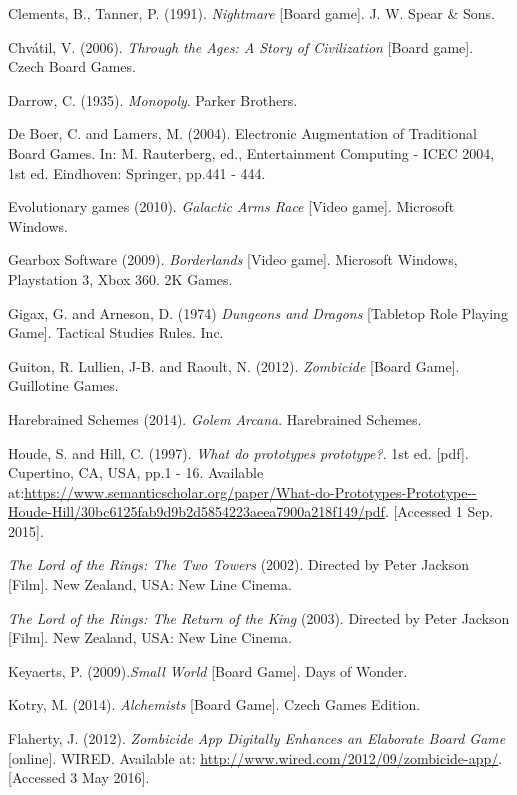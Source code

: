 \documentclass[a4paper,11pt]{report}
\begin{document}
\begin{thebibliography}{1}
Clements, B., Tanner, P. (1991). \textit{Nightmare} [Board game]. J. W. Spear \& Sons.

Chvátil, V. (2006). \textit{Through the Ages: A Story of Civilization} [Board game]. Czech Board Games.

Darrow, C. (1935). \textit{Monopoly}. Parker Brothers.

De Boer, C. and Lamers, M. (2004). Electronic Augmentation of Traditional Board Games. In: M. Rauterberg, ed., Entertainment Computing - ICEC 2004, 1st ed. Eindhoven: Springer, pp.441 - 444.

Evolutionary games (2010). \textit{Galactic Arms Race} [Video game]. Microsoft Windows. 

Gearbox Software (2009). \textit{Borderlands} [Video game]. Microsoft Windows, Playstation 3, Xbox 360. 2K Games.

Gigax, G. and Arneson, D. (1974) \textit{Dungeons and Dragons} [Tabletop Role Playing Game]. Tactical Studies Rules. Inc.

Guiton, R. Lullien, J-B. and Raoult, N. (2012). \textit{Zombicide} [Board Game]. Guillotine Games.

Harebrained Schemes (2014). \textit{Golem Arcana}. Harebrained Schemes.

Houde, S. and Hill, C. (1997). \textit{What do prototypes prototype?}. 1st ed. [pdf]. Cupertino, CA, USA, pp.1 - 16. Available at:\url{https://www.semanticscholar.org/paper/What-do-Prototypes-Prototype--Houde-Hill/30bc6125fab9d9b2d5854223aeea7900a218f149/pdf}. [Accessed 1 Sep. 2015].

\textit{The Lord of the Rings: The Two Towers} (2002). Directed by Peter Jackson [Film]. New Zealand, USA: New Line Cinema.

\textit{The Lord of the Rings: The Return of the King} (2003). Directed by Peter Jackson [Film]. New Zealand, USA: New Line Cinema.

Keyaerts, P. (2009).\textit{Small World} [Board Game]. Days of Wonder.

Kotry, M. (2014). \textit{Alchemists} [Board Game]. Czech Games Edition.

Flaherty, J. (2012). \textit{Zombicide App Digitally Enhances an Elaborate Board Game} [online]. WIRED. Available at: \url{http://www.wired.com/2012/09/zombicide-app/}. [Accessed 3 May 2016].


\end{thebibliography}
\end{document}
